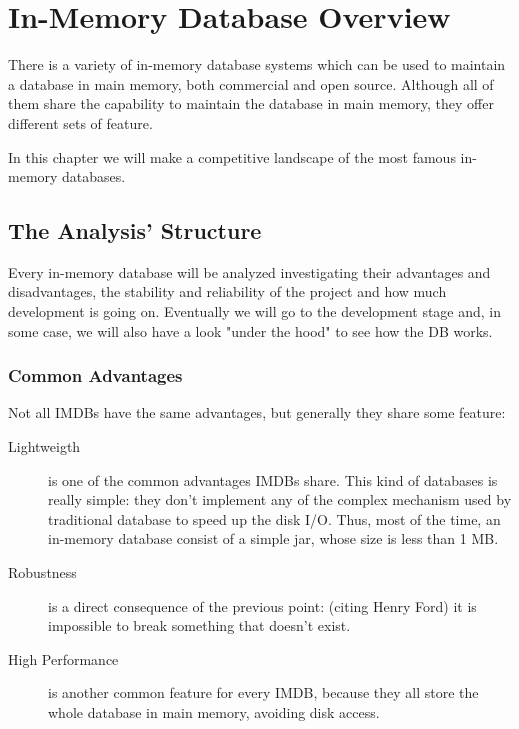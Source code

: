 \chapter{In-Memory Database Overview}
	There is a variety of in-memory database systems which can be used to maintain a 
	database in main memory, both commercial and open source. Although all of them share the capability 
	to maintain the database in main memory, they offer different sets of feature. 
	
	In this chapter we will make a competitive landscape of the most famous in-memory databases.
	
	\section{The Analysis' Structure}
	Every in-memory database will be analyzed investigating 
	their advantages and disadvantages, the stability and reliability of the project 
	and how much development is going on. Eventually we will go to the development stage and, 
	in some case, we will also have a look "under the hood" to see how the DB works.
	
	\subsection{Common Advantages}
	Not all IMDBs have the same advantages, but generally they share some feature:
	
	\begin{description}
		\item[Lightweigth] is one of the common advantages IMDBs share. This kind of databases is really simple: they 
		don't implement any of the complex mechanism used by traditional database to speed up the disk I/O. Thus, 
		most of the time, an in-memory database consist of a simple jar, whose size is less than 1 MB. 
		\item[Robustness] is a direct consequence of the previous point: (citing Henry Ford) it is impossible to 
		break something that doesn't exist.
		\item[High Performance] is another common feature for every IMDB, because they all store the whole database 
		in main memory, avoiding disk access.
	\end{description}
	
